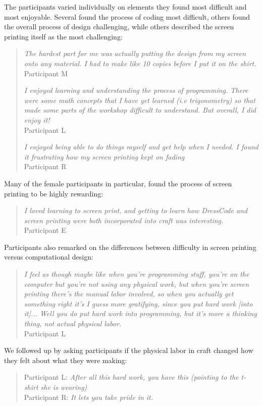 \documentclass{sigchi}
\begin{document}
The participants varied individually on elements they found most difficult and most enjoyable. Several found the process of coding most difficult, others found the overall process of design challenging, while others described the screen printing itself as the most challenging:
\begin{quotation}

\textit{The hardest part for me was actually putting the design from my screen onto any material. I had to make like 10 copies before I put it on the shirt.}
\\Participant M

\textit{I enjoyed learning and understanding the process of programming. There were some math concepts that I have yet learned (i.e trigonometry) so that made some parts of the workshop difficult to understand. But overall, I did enjoy it!}
\\Participant L

\textit{I enjoyed being able to do things myself and get help when I needed. I found it frustrating how my screen printing kept on fading}
\\Participant R

\end{quotation}

Many of the female participants in particular, found the process of screen printing to be highly rewarding:
\begin{quotation}
\textit{I loved learning to screen print, and getting to learn how DressCode and screen printing were both incorporated into craft was interesting.}
\\Participant E
\end{quotation}

Participants  also remarked on the differences between difficulty in screen printing versus computational design:
\begin{quotation}
\textit{I feel as though maybe like when you're programming stuff, you're on the computer but you're not using any physical work, but when you're screen printing there's the manual labor involved, so when you actually get something right it's I guess more gratifying, since you put hard work [into it]... Well you do put hard work into programming, but it's more a thinking thing, not actual physical labor.}
\\Participant L
\end{quotation}

We followed up by asking participants if the physical labor in craft changed how they felt about what they were making:
\begin{quotation}
Participant L: \textit{After all this hard work, you have this (pointing to the t-shirt she is wearing)}
\\Participant R: \textit{It lets you take pride in it.}
\end{quotation}
\end{document}
